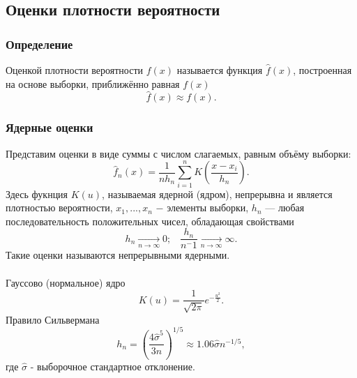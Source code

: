 	\subsection{Оценки плотности вероятности}
	\subsubsection{Определение}
	\noindent Оценкой плотности вероятности $f(x)$ называется функция $\widehat{f}(x)$, построенная на основе выборки, приближённо равная $f(x)$
    \begin{equation}
        \widehat{f}(x)\approx f(x).
    \end{equation}
	\subsubsection{Ядерные оценки}
	\noindent Представим оценки в виде суммы с числом слагаемых, равным объёму выборки:\begin{equation}
        \widehat{f}_n(x)=\frac{1}{n h_n}\sum_{i=1}^n K\left(\frac{x-x_i}{h_n}\right).
    \end{equation}
    Здесь фукнция $K(u)$, называемая ядерной (ядром), непрерывна и является плотностью вероятности, $x_1,...,x_n$ $-$ элементы выборки, ${h_n}$ — любая последовательность положительных чисел, обладающая свойствами
    \begin{equation}
        h_n\xrightarrow[n\to\infty]{}0;\;\;\;\frac{h_n}{n^-1} \xrightarrow[n\to\infty]{}\infty.
    \end{equation}
    Такие оценки называются непрерывными ядерными.\\\\
    Гауссово (нормальное) ядро \cite[c. 38]{litlink4}
    \begin{equation}
        K(u)=\frac{1}{\sqrt{2\pi}}e^{-\frac{u^2}{2}}.
    \end{equation}
    Правило Сильвермана \cite[c. 44]{litlink4}
    \begin{equation}
        h_n=\left(\frac{4\hat{\sigma}^5}{3n}\right)^{1/5}\approx1.06\hat{\sigma}n^{-1/5},
    \end{equation}
    где $\hat{\sigma}$ - выборочное стандартное отклонение.